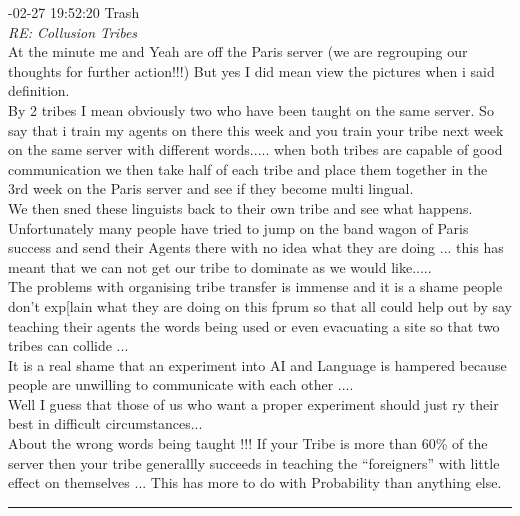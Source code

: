 \begin{mail}
{-02-27 19:52:20	Trash}\\
{\itshape RE: Collusion Tribes}\\
At the minute me and Yeah are off the Paris server (we are regrouping our thoughts for further action!!!)
But yes I did mean view the pictures when i said definition.\\
By 2 tribes I mean obviously two who have been taught on the same server.
So say that i train my agents on there this week and you train your tribe next week on the same server with different words..... when both tribes are capable of good communication we then take half of each tribe and place them together in the 3rd week on the Paris server and see if they become multi lingual.\\
We then sned these linguists back to their own tribe and see what happens.\\ \clearpage
Unfortunately many people have tried to jump on the band wagon of Paris success and send their Agents there with no idea what they are doing ... this has meant that we can not get our tribe to dominate as we would like.....\\
The problems with organising tribe transfer is immense and it is a shame people don't exp[lain what they are doing on this fprum so that all could help out by say teaching their agents the words being used or even evacuating a site so that two tribes can collide ...\\
It is a real shame that an experiment into AI and Language is hampered because people are unwilling to communicate with each other .... \\
Well I guess that those of us who want a proper experiment should just ry their best in difficult circumstances...\\
About the wrong words being taught !!! If your Tribe is more than 60\% of the server then your tribe generallly succeeds in teaching the ``foreigners'' with little effect on themselves ... This has more to do with Probability than anything else.

\rule{0.8\textwidth}{.4pt}


\end{mail}

